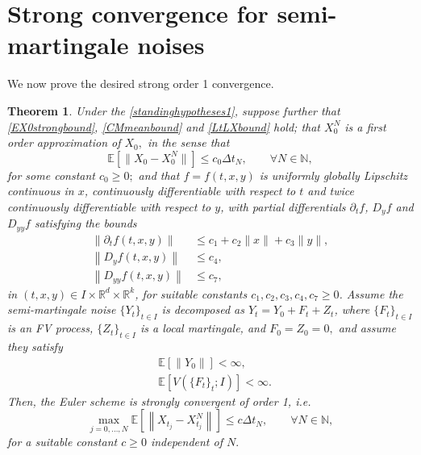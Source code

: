 \documentclass[reqno,12pt]{amsart}
\theoremstyle{plain} %
\newtheorem{theorem}{Theorem}[section]
\theoremstyle{definition} %
\begin{document}
\section{Strong convergence for semi-martingale noises}
\label{secsubmartingale}

We now prove the desired strong order 1 convergence.

\begin{theorem}
    \label{thmsemimartingale}
    Under the \cref{standinghypotheses1}, suppose further that \cref{EX0strongbound}, \cref{CMmeanbound} and \cref{LtLXbound} hold; that $X_0^N$ is a first order approximation of $X_0,$ in the sense that 
    \begin{equation}
        \label{EX0X0Nunif}
        \mathbb{E}[\|X_0 - X_0^N\|] \leq c_0 \Delta t_N, \qquad \forall N\in \mathbb{N},
    \end{equation}
    for some constant $c_0 \geq 0;$ and that $f=f(t, x, y)$ is uniformly globally Lipschitz continuous in $x$, continuously differentiable with respect to $t$ and twice continuously differentiable with respect to $y$, with partial differentials $\partial_t f$, $D_y f$ and $D_{yy} f$ satisfying the bounds
    \begin{align}
        \label{ftfyunifboundcadlagfvpartialt}
        \left\|\partial_t f(t, x, y)\right\| & \leq c_1 + c_2\|x\| + c_3\|y\|, \\
        \label{ftfyunifboundcadlagfvpartialy}
        \left\|D_y f(t, x, y)\right\| & \leq c_4, \\
        \label{ftfyunifboundcadlagfvpartialyy}
        \left\|D_{yy} f(t, x, y)\right\| & \leq c_7,
    \end{align}
    in $(t, x, y)\in I\times \mathbb{R}^d\times \mathbb{R}^k$, for suitable constants $c_1, c_2, c_3, c_4, c_7 \geq 0$. Assume the semi-martingale noise $\{Y_t\}_{t\in I}$ is decomposed as $Y_t = Y_0 + F_t + Z_t$, where $\{F_t\}_{t\in I}$ is an FV process, $\{Z_t\}_{t\in I}$ is a local martingale, and $F_0 = Z_0 = 0,$ and assume they satisfy
    \begin{align}
        \label{Y0finiteexpectation}
        & \mathbb{E}\left[\|Y_0\|\right] < \infty, \\
        \label{expectFVFtfinite}
        & \mathbb{E}\left[V(\{F_t\}_t; I)\right] < \infty.
    \end{align}   
    Then, the Euler scheme is strongly convergent of order 1, i.e.
    \begin{equation}
        \label{ordersemimartingaleunif}
        \max_{j=0, \ldots, N} \mathbb{E}\left[\left\| X_{t_j} - X_{t_j}^N \right\|\right] \leq c \Delta t_N, \qquad \forall N \in \mathbb{N},
    \end{equation}
    for a suitable constant $c\geq 0$ independent of $N.$
\end{theorem}
\end{document}
